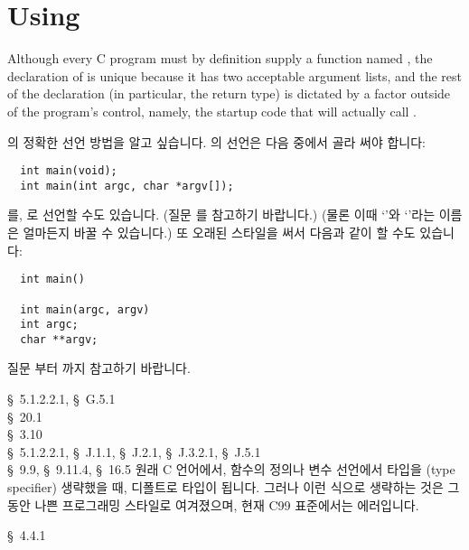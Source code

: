 \section{Using }
Although every C program must by definition supply a function named
, the declaration of  is unique because it has two acceptable
argument lists, and the rest of the declaration (in particular, the return
type) is dictated by a factor outside of the program's control, namely, the
startup code that will actually call .

\begin{faq}
	의 정확한 선언 방법을 알고 싶습니다.
\A
	의 선언은 다음 중에서 골라 써야 합니다:
\begin{verbatim}
  int main(void);
  int main(int argc, char *argv[]);
\end{verbatim}
	\noindent {}를, 로 선언할 수도 있습니다.
        (질문 를 참고하기 바랍니다.)
	\noindent (물론 이때 `'와 `'라는 이름은
	얼마든지 바꿀 수 있습니다.)  또 오래된 스타일을 써서 다음과 같이
        할 수도 있습니다:
\begin{verbatim}
  int main()

  int main(argc, argv)
  int argc;
  char **argv;
\end{verbatim}

        질문 부터 까지 참고하기 바랍니다. 

\R
	\cite{c89} \S\ 5.1.2.2.1, \S\ G.5.1 \\
	\cite{hs} \S\ 20.1  \\
	\cite{ctp} \S\ 3.10  \\

        \cite{c99} \S\ 5.1.2.2.1, 
                   \S\ J.1.1, \S\ J.2.1, \S\ J.3.2.1, \S\ J.5.1 \\
        \cite{hs5} \S\ 9.9, \S\ 9.11.4, \S\ 16.5
\T
	원래 C 언어에서, 함수의 정의나 변수 선언에서 타입을 (type specifier)
        생략했을 때, 디폴트로  타입이 됩니다. 그러나 이런 식으로
        생략하는 것은 그 동안 나쁜 프로그래밍 스타일로 여겨졌으며,
        현재 C99 표준에서는 에러입니다. 

        \cite{hs5} \S\ 4.4.1
\end{faq}

